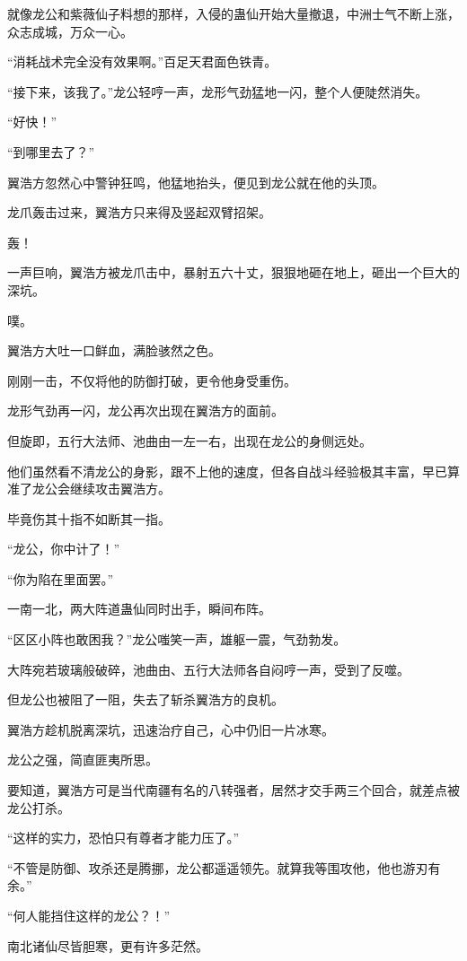 \begin{this_body}
就像龙公和紫薇仙子料想的那样，入侵的蛊仙开始大量撤退，中洲士气不断上涨，众志成城，万众一心。

“消耗战术完全没有效果啊。”百足天君面色铁青。

“接下来，该我了。”龙公轻哼一声，龙形气劲猛地一闪，整个人便陡然消失。

“好快！”

“到哪里去了？”

翼浩方忽然心中警钟狂鸣，他猛地抬头，便见到龙公就在他的头顶。

龙爪轰击过来，翼浩方只来得及竖起双臂招架。

轰！

一声巨响，翼浩方被龙爪击中，暴射五六十丈，狠狠地砸在地上，砸出一个巨大的深坑。

噗。

翼浩方大吐一口鲜血，满脸骇然之色。

刚刚一击，不仅将他的防御打破，更令他身受重伤。

龙形气劲再一闪，龙公再次出现在翼浩方的面前。

但旋即，五行大法师、池曲由一左一右，出现在龙公的身侧远处。

他们虽然看不清龙公的身影，跟不上他的速度，但各自战斗经验极其丰富，早已算准了龙公会继续攻击翼浩方。

毕竟伤其十指不如断其一指。

“龙公，你中计了！”

“你为陷在里面罢。”

一南一北，两大阵道蛊仙同时出手，瞬间布阵。

“区区小阵也敢困我？”龙公嗤笑一声，雄躯一震，气劲勃发。

大阵宛若玻璃般破碎，池曲由、五行大法师各自闷哼一声，受到了反噬。

但龙公也被阻了一阻，失去了斩杀翼浩方的良机。

翼浩方趁机脱离深坑，迅速治疗自己，心中仍旧一片冰寒。

龙公之强，简直匪夷所思。

要知道，翼浩方可是当代南疆有名的八转强者，居然才交手两三个回合，就差点被龙公打杀。

“这样的实力，恐怕只有尊者才能力压了。”

“不管是防御、攻杀还是腾挪，龙公都遥遥领先。就算我等围攻他，他也游刃有余。”

“何人能挡住这样的龙公？！”

南北诸仙尽皆胆寒，更有许多茫然。


\end{this_body}
